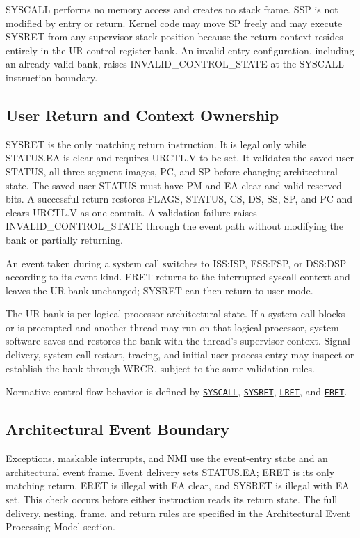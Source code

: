 SYSCALL performs no memory access and creates no stack frame. SSP is not modified by entry or return. Kernel code may
move SP freely and may execute SYSRET from any supervisor stack position because the return context resides entirely
in the UR control-register bank. An invalid entry configuration, including an already valid bank, raises
INVALID\_CONTROL\_STATE at the SYSCALL instruction boundary.

\subsection{User Return and Context Ownership}
SYSRET is the only matching return instruction. It is legal only while STATUS.EA is clear and requires URCTL.V to be
set. It validates the saved user STATUS, all three segment images, PC, and SP before changing architectural state.
The saved user STATUS must have PM and EA clear and valid reserved bits. A successful return restores FLAGS, STATUS,
CS, DS, SS, SP, and PC and clears URCTL.V as one commit. A validation failure raises
INVALID\_CONTROL\_STATE through the event path without modifying the bank or partially returning.

An event taken during a system call switches to ISS:ISP, FSS:FSP, or DSS:DSP according to its event kind. ERET
returns to the interrupted syscall context and leaves the UR bank unchanged; SYSRET can then return to user mode.

The UR bank is per-logical-processor architectural state. If a system call blocks or is preempted and another thread
may run on that logical processor, system software saves and restores the bank with the thread's supervisor context.
Signal delivery, system-call restart, tracing, and initial user-process entry may inspect or establish the bank
through WRCR, subject to the same validation rules.

Normative control-flow behavior is defined by
\hyperref[instr:syscall]{\texttt{SYSCALL}},
\hyperref[instr:sysret]{\texttt{SYSRET}},
\hyperref[instr:lret]{\texttt{LRET}}, and
\hyperref[instr:eret]{\texttt{ERET}}.\par

\subsection{Architectural Event Boundary}
Exceptions, maskable interrupts, and NMI use the event-entry state and an architectural event frame. Event delivery
sets STATUS.EA; ERET is its only matching return. ERET is illegal with EA clear, and SYSRET is illegal with EA set.
This check occurs before either instruction reads its return state. The full delivery, nesting, frame, and return
rules are specified in the Architectural Event Processing Model section.
